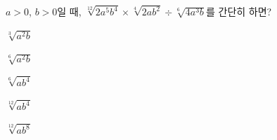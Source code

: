 $a>0$, $b>0$일 때, $\sqrt[12]{2a^5b^4}\times\sqrt[4]{2ab^2}\div\sqrt[6]{4a^3b}$를 간단히 하면?
\begin{choices32}{\rule[-3ex]{0pt}{8ex}$\sqrt[3]{a^2b}$}{\rule[-3ex]{0pt}{8ex}$\sqrt[6]{a^2b}$}{\rule[-3ex]{0pt}{8ex}$\sqrt[6]{ab^4}$}{\rule[-3ex]{0pt}{8ex}$\sqrt[12]{ab^4}$}{\rule[-3ex]{0pt}{8ex}$\sqrt[12]{ab^8}$}\end{choices32}
